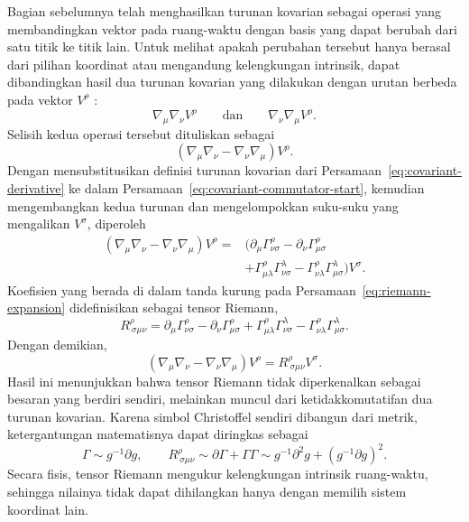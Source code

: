 Bagian sebelumnya telah menghasilkan turunan kovarian sebagai operasi yang
membandingkan vektor pada ruang-waktu dengan basis yang dapat berubah dari
satu titik ke titik lain. Untuk melihat apakah perubahan tersebut hanya
berasal dari pilihan koordinat atau mengandung kelengkungan intrinsik,
dapat dibandingkan hasil dua turunan kovarian yang dilakukan dengan urutan
berbeda pada vektor $V^\rho$ \parencite{Schutz2009FirstCourse,Carroll2004SpacetimeGeometry}:
\begin{equation}
    \nabla_\mu\nabla_\nu V^\rho
    \qquad\text{dan}\qquad
    \nabla_\nu\nabla_\mu V^\rho.
\end{equation}
Selisih kedua operasi tersebut dituliskan sebagai
\begin{equation}
    \left(\nabla_\mu\nabla_\nu-\nabla_\nu\nabla_\mu\right)V^\rho.
    \label{eq:covariant-commutator-start}
\end{equation}
Dengan mensubstitusikan definisi turunan kovarian dari
Persamaan~\eqref{eq:covariant-derivative} ke dalam
Persamaan~\eqref{eq:covariant-commutator-start}, kemudian mengembangkan
kedua turunan dan mengelompokkan suku-suku yang mengalikan $V^\sigma$,
diperoleh
\begin{equation}
\begin{split}
    \left(\nabla_\mu\nabla_\nu-\nabla_\nu\nabla_\mu\right)V^\rho
    ={}&\Big(
    \partial_\mu\Gamma^\rho_{\nu\sigma}
    -\partial_\nu\Gamma^\rho_{\mu\sigma} \\
    &+\Gamma^\rho_{\mu\lambda}\Gamma^\lambda_{\nu\sigma}
    -\Gamma^\rho_{\nu\lambda}\Gamma^\lambda_{\mu\sigma}
    \Big)V^\sigma.
\end{split}
    \label{eq:riemann-expansion}
\end{equation}
Koefisien yang berada di dalam tanda kurung pada
Persamaan~\eqref{eq:riemann-expansion} didefinisikan sebagai tensor Riemann,
\begin{equation}
    R^\rho_{\ \sigma\mu\nu}
    =\partial_\mu\Gamma^\rho_{\nu\sigma}
    -\partial_\nu\Gamma^\rho_{\mu\sigma}
    +\Gamma^\rho_{\mu\lambda}\Gamma^\lambda_{\nu\sigma}
    -\Gamma^\rho_{\nu\lambda}\Gamma^\lambda_{\mu\sigma}.
    \label{eq:riemann}
\end{equation}
Dengan demikian,
\begin{equation}
    \left(\nabla_\mu\nabla_\nu-\nabla_\nu\nabla_\mu\right)V^\rho
    =R^\rho_{\ \sigma\mu\nu}V^\sigma.
    \label{eq:riemann-commutator}
\end{equation}
Hasil ini menunjukkan bahwa tensor Riemann tidak diperkenalkan sebagai
besaran yang berdiri sendiri, melainkan muncul dari ketidakkomutatifan dua
turunan kovarian. Karena simbol Christoffel sendiri dibangun dari metrik,
ketergantungan matematisnya dapat diringkas sebagai
\begin{equation}
    \Gamma\sim g^{-1}\partial g,
    \qquad
    R^\rho_{\ \sigma\mu\nu}
    \sim \partial\Gamma+\Gamma\Gamma
    \sim g^{-1}\partial^2g+(g^{-1}\partial g)^2.
    \label{eq:riemann-dependence}
\end{equation}
Secara fisis, tensor Riemann mengukur kelengkungan intrinsik ruang-waktu,
sehingga nilainya tidak dapat dihilangkan hanya dengan memilih sistem
koordinat lain.

